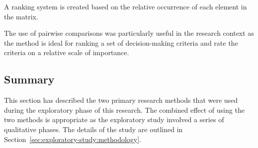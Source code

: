 A ranking system is created
based on the relative occurrence of each element in the matrix.

The use of pairwise comparisons was particularly useful in the research context
as the method is ideal for ranking a set of decision-making criteria and rate
the criteria on a relative scale of importance.

\subsection{Summary}
\label{sec:exploratory-study:research-methods:summary}

This section has described the two primary research methods that were used
during the exploratory phase of this research. The combined effect of using the
two methods is appropriate as the exploratory study involved a series of
qualitative phases. The details of the study are outlined in Section~\ref{sec:exploratory-study:methodology}.
